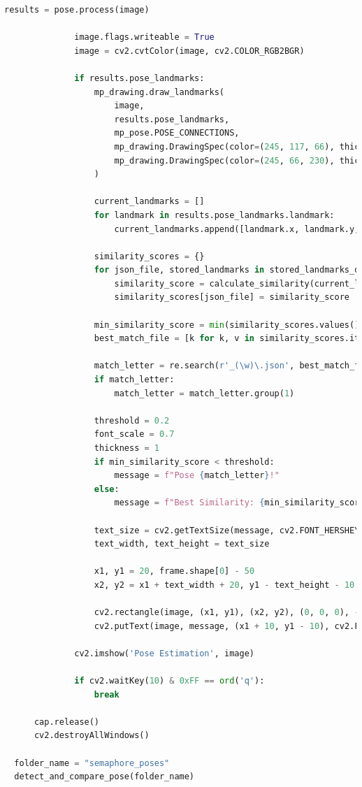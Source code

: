 \documentclass[a4paper,12pt]{article}
\begin{document}
\begin{lstlisting}[language=Python, caption={Kode Program untuk Menguji dan Membandingkan Pose}]
              results = pose.process(image)
  
              image.flags.writeable = True
              image = cv2.cvtColor(image, cv2.COLOR_RGB2BGR)
  
              if results.pose_landmarks:
                  mp_drawing.draw_landmarks(
                      image,
                      results.pose_landmarks,
                      mp_pose.POSE_CONNECTIONS,
                      mp_drawing.DrawingSpec(color=(245, 117, 66), thickness=2, circle_radius=2),
                      mp_drawing.DrawingSpec(color=(245, 66, 230), thickness=2, circle_radius=2)
                  )
  
                  current_landmarks = []
                  for landmark in results.pose_landmarks.landmark:
                      current_landmarks.append([landmark.x, landmark.y, landmark.z])
  
                  similarity_scores = {}
                  for json_file, stored_landmarks in stored_landmarks_dict.items():
                      similarity_score = calculate_similarity(current_landmarks, stored_landmarks)
                      similarity_scores[json_file] = similarity_score
  
                  min_similarity_score = min(similarity_scores.values())
                  best_match_file = [k for k, v in similarity_scores.items() if v == min_similarity_score][0]
  
                  match_letter = re.search(r'_(\w)\.json', best_match_file)
                  if match_letter:
                      match_letter = match_letter.group(1)
  
                  threshold = 0.2
                  font_scale = 0.7
                  thickness = 1
                  if min_similarity_score < threshold:
                      message = f"Pose {match_letter}!"
                  else:
                      message = f"Best Similarity: {min_similarity_score:.2f}"
  
                  text_size = cv2.getTextSize(message, cv2.FONT_HERSHEY_SIMPLEX, font_scale, thickness)[0]
                  text_width, text_height = text_size
  
                  x1, y1 = 20, frame.shape[0] - 50
                  x2, y2 = x1 + text_width + 20, y1 - text_height - 10
  
                  cv2.rectangle(image, (x1, y1), (x2, y2), (0, 0, 0), -1)
                  cv2.putText(image, message, (x1 + 10, y1 - 10), cv2.FONT_HERSHEY_SIMPLEX, font_scale, (255, 255, 255), thickness)
  
              cv2.imshow('Pose Estimation', image)
  
              if cv2.waitKey(10) & 0xFF == ord('q'):
                  break
  
      cap.release()
      cv2.destroyAllWindows()
  
  folder_name = "semaphore_poses"
  detect_and_compare_pose(folder_name)
\end{lstlisting}
\end{document}
